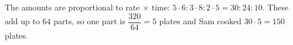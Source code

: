 The amounts are proportional to rate $\times$ time: $5\cdot6:3\cdot8:2\cdot5=30:24:10$. These add up to $64$ parts, so one part is $\dfrac{320}{64}=5$ plates and Sam cooked $30\cdot5=\boxed{150}$ plates.
